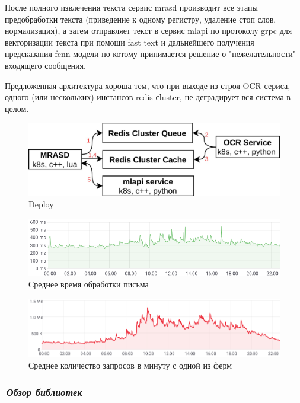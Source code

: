 \documentclass[12pt]{article}
\begin{document}
После полного извлечения текста сервис mrasd производит все этапы предобработки текста (приведение к одному регистру, удаление стоп слов, нормализация), а затем отправляет текст в сервис mlapi по протоколу grpc для векторизации текста при помощи fast text и дальнейшего получения предсказания fcnn модели по котому принимается решение о "нежелательности"  входящего сообщения.

Предложенная архитектура хороша тем, что при выходе из строя OCR сериса, одного (или нескольких) инстансов redis сluster, не деградирует вся система в целом.
 
\begin{figure}[h!]
	\center
	\includegraphics[scale=0.25]{deploy.jpg}
	\caption{Deploy}
	\label{fig:02}
\end{figure}


\begin{figure}[h!]
	\center
	\includegraphics[scale=0.6]{timings.png}
	\caption{Среднее время обработки письма}
	\label{fig:03}
\end{figure}


\begin{figure}[h!]
	\center
	\includegraphics[scale=0.5]{processed_messages.png}
	\caption{Среднее количество запросов в минуту с одной из ферм}
	\label{fig:04}
\end{figure}

\subsubsection*{\it\,Обзор библиотек}
\end{document}
